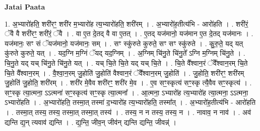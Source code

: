 \documentclass[17pt]{extarticle}
\begin{document}
\textbf{Jatai Paata} \newline

1. अ॒भ्यारो॑हति॒ शरी॑रꣳ॒॒ शरी॑र म॒भ्यारो॑ह त्य॒भ्यारो॑हति॒ शरी॑रम् । . अ॒भ्यारो॑ह॒तीत्य॑भि - आरो॑हति । . शरी॑रं॒ ॅवै वै शरी॑रꣳ॒॒ शरी॑रं॒ ॅवै । . वा ए॒त दे॒तद् वै वा ए॒तत् । . ए॒तद् यज॑मानो॒ यज॑मान ए॒त दे॒तद् यज॑मानः । . यज॑मानः॒ सꣳ सं ॅयज॑मानो॒ यज॑मानः॒ सम् । . सꣳ स्कु॑रुते कुरुते॒ सꣳ सꣳ स्कु॑रुते । . कु॒रु॒ते॒ यद् यत् कु॑रुते कुरुते॒ यत् । . यद॒ग्नि म॒ग्निं ॅयद् यद॒ग्निम् । . अ॒ग्निम् चि॑नु॒ते चि॑नु॒ते᳚ ऽग्नि म॒ग्निम् चि॑नु॒ते । . चि॒नु॒ते यद् यच् चि॑नु॒ते चि॑नु॒ते यत् । . यच् चि॒ते चि॒ते यद् यच् चि॒ते । . चि॒ते वै᳚श्वान॒रं ॅवै᳚श्वान॒रम् चि॒ते चि॒ते वै᳚श्वान॒रम् । . वै॒श्वा॒न॒रम् जु॒होति॑ जु॒होति॑ वैश्वान॒रं ॅवै᳚श्वान॒रम् जु॒होति॑ । . जु॒होति॒ शरी॑रꣳ॒॒ शरी॑रम् जु॒होति॑ जु॒होति॒ शरी॑रम् । . शरी॑र मे॒वैव शरी॑रꣳ॒॒ शरी॑र मे॒व । . ए॒व सꣳ॒॒स्कृत्य॑ सꣳ॒॒स्कृ त्यै॒वैव सꣳ॒॒स्कृत्य॑ । . सꣳ॒॒स्कृ त्या॒त्मना॒ ऽऽत्मना॑ सꣳ॒॒स्कृत्य॑ सꣳ॒॒स्कृ त्या॒त्मना᳚ । . आ॒त्मना॒ ऽभ्यारो॑ह त्य॒भ्यारो॑ह त्या॒त्मना॒ ऽऽत्मना॒ ऽभ्यारो॑हति । . अ॒भ्यारो॑हति॒ तस्मा॒त् तस्मा॑ द॒भ्यारो॑ह त्य॒भ्यारो॑हति॒ तस्मा᳚त् । . अ॒भ्यारो॑ह॒तीत्य॑भि - आरो॑हति । . तस्मा॒त् तस्य॒ तस्य॒ तस्मा॒त् तस्मा॒त् तस्य॑ । . तस्य॒ न न तस्य॒ तस्य॒ न । . नावाव॒ न नाव॑ । . अव॑ द्यन्ति द्य॒न् त्यवाव॑ द्यन्ति । . द्य॒न्ति॒ जीव॒न् जीव॑न् द्यन्ति द्यन्ति॒ जीवन्न्॑ । \newline
\end{document}
